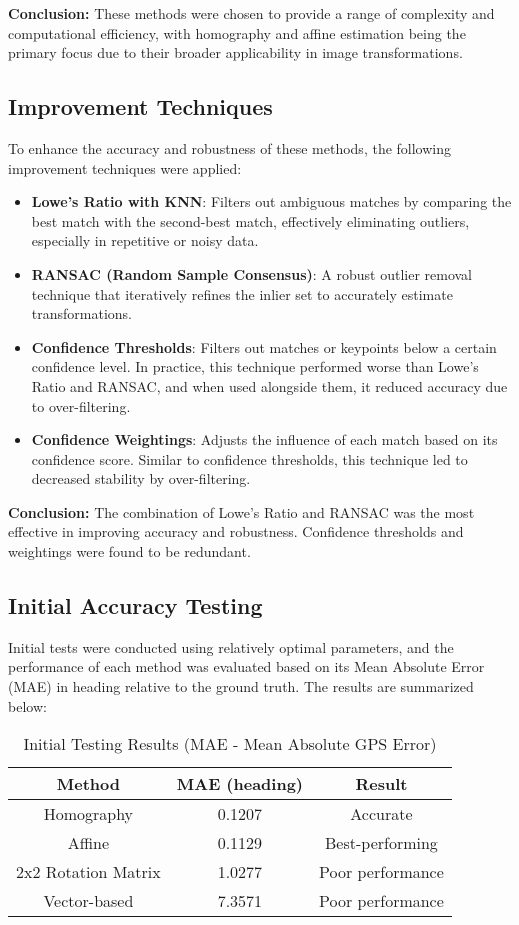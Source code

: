 \textbf{Conclusion:} These methods were chosen to provide a range of complexity and computational efficiency, with homography and affine estimation being the primary focus due to their broader applicability in image transformations.

\subsection{Improvement Techniques}
To enhance the accuracy and robustness of these methods, the following improvement techniques were applied:
\begin{itemize}
    \item \textbf{Lowe's Ratio with KNN}: Filters out ambiguous matches by comparing the best match with the second-best match, effectively eliminating outliers, especially in repetitive or noisy data.
    \item \textbf{RANSAC (Random Sample Consensus)}: A robust outlier removal technique that iteratively refines the inlier set to accurately estimate transformations.
    \item \textbf{Confidence Thresholds}: Filters out matches or keypoints below a certain confidence level. In practice, this technique performed worse than Lowe's Ratio and RANSAC, and when used alongside them, it reduced accuracy due to over-filtering.
    \item \textbf{Confidence Weightings}: Adjusts the influence of each match based on its confidence score. Similar to confidence thresholds, this technique led to decreased stability by over-filtering.
\end{itemize}

\textbf{Conclusion:} The combination of Lowe's Ratio and RANSAC was the most effective in improving accuracy and robustness. Confidence thresholds and weightings were found to be redundant.

\subsection{Initial Accuracy Testing}
Initial tests were conducted using relatively optimal parameters, and the performance of each method was evaluated based on its Mean Absolute Error (MAE) in heading relative to the ground truth. The results are summarized below:

\begin{table}[H]
    \centering
    \begin{tabular}{|c|c|c|}
        \hline
        \textbf{Method} & \textbf{MAE (heading)} & \textbf{Result} \\
        \hline
        Homography & 0.1207 & Accurate \\  
        Affine & 0.1129 & Best-performing \\  
        2x2 Rotation Matrix & 1.0277 & Poor performance \\  
        Vector-based & 7.3571 & Poor performance \\  
        \hline
    \end{tabular}
    \caption{Initial Testing Results (MAE - Mean Absolute GPS Error)}
\end{table}

